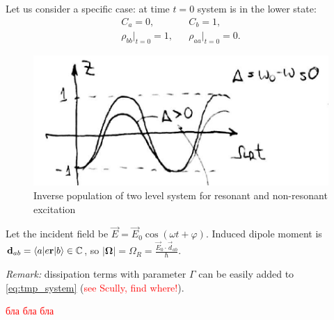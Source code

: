 Let us consider a specific case: at time $t= 0$ system is in the lower state:
\begin{equation}
	\begin{matrix}
			C_a = 0, & & C_b = 1, \\
		\rho_{bb} \big|_{t=0} = 1, & & \rho_{aa} \big|_{t=0} = 0.
	\end{matrix}
\end{equation}
\begin{figure}[h!]
	\centering
	\includegraphics[width=0.6\linewidth]{fig/L5/invers_population}
	\caption{Inverse population of two level system for resonant and non-resonant excitation}
	\label{fig:inverspopulation}
\end{figure}
Let the incident field be $\vec{E} = \vec{E}_0 \cos \left( \omega t + \varphi \right)$. Induced dipole moment is $\mathbf{d}_{ab} = \langle a\rvert e \mathbf{r} \lvert b\rangle \in \mathbb{C}$, so $\left| \bm{\Omega} \right| = \Omega_R = \frac{\vec{E}_0 \cdot \vec{d}_{ab}}{\hbar}$. 

\textit{Remark:} dissipation terms with parameter $\Gamma$ can be easily added to \eqref{eq:tmp_system} (\textcolor{red}{see Scully, find where!}).

\begin{otherlanguage}{russian}
	\begin{hw}
		\textcolor{red}{бла бла бла}
	\end{hw}
\end{otherlanguage}


